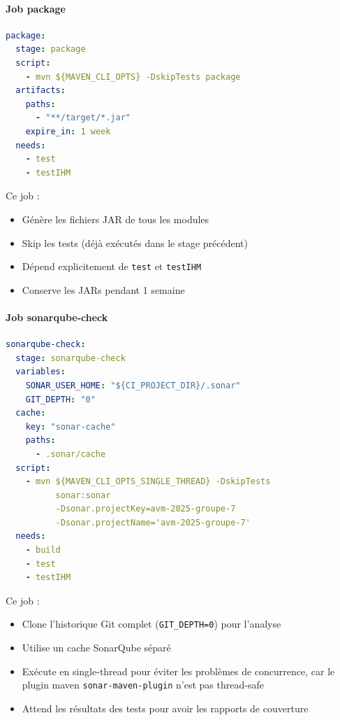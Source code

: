 \paragraph{Job package}

\vspace{0.3cm}
\begin{lstlisting}[language=yaml, caption=Job de package]
package:
  stage: package
  script:
    - mvn ${MAVEN_CLI_OPTS} -DskipTests package
  artifacts:
    paths:
      - "**/target/*.jar"
    expire_in: 1 week
  needs:
    - test
    - testIHM
\end{lstlisting}

Ce job :
\begin{itemize}
    \item Génère les fichiers JAR de tous les modules
    \item Skip les tests (déjà exécutés dans le stage précédent)
    \item Dépend explicitement de \texttt{test} et \texttt{testIHM}
    \item Conserve les JARs pendant 1 semaine
\end{itemize}

\paragraph{Job sonarqube-check}

\vspace{0.3cm}
\begin{lstlisting}[language=yaml, caption=Job d'analyse SonarQube]
sonarqube-check:
  stage: sonarqube-check
  variables:
    SONAR_USER_HOME: "${CI_PROJECT_DIR}/.sonar"
    GIT_DEPTH: "0"
  cache:
    key: "sonar-cache"
    paths:
      - .sonar/cache
  script:
    - mvn ${MAVEN_CLI_OPTS_SINGLE_THREAD} -DskipTests
          sonar:sonar
          -Dsonar.projectKey=avm-2025-groupe-7
          -Dsonar.projectName='avm-2025-groupe-7'
  needs:
    - build
    - test
    - testIHM
\end{lstlisting}

Ce job :
\begin{itemize}
    \item Clone l'historique Git complet (\texttt{GIT\_DEPTH=0}) pour l'analyse
    \item Utilise un cache SonarQube séparé
    \item Exécute en single-thread pour éviter les problèmes de concurrence, car le plugin maven \texttt{sonar-maven-plugin} n'est pas thread-safe
    \item Attend les résultats des tests pour avoir les rapports de couverture
\end{itemize}

